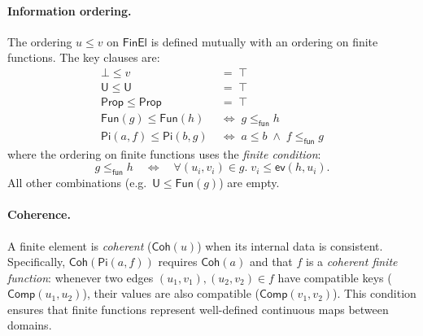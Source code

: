 \documentclass[11pt]{article}
\newcommand{\PropCode}{\mathsf{Prop}}
\newcommand{\FinEl}{\mathsf{FinEl}}
\newcommand{\Bot}{\bot}
\newcommand{\UCode}{\mathsf{U}}
\newcommand{\FunEl}[1]{\mathsf{Fun}(#1)}
\newcommand{\PiC}[2]{\mathsf{Pi}(#1,#2)}
\newcommand{\EvalFun}{\mathsf{ev}}
\newcommand{\LeCode}{\leq}
\newcommand{\Coh}{\mathsf{Coh}}
\begin{document}
\paragraph{Information ordering.}
The ordering $u \LeCode v$ on $\FinEl$ is defined mutually with
an ordering on finite functions.  The key clauses are:
\begin{align*}
  \Bot \LeCode v &\;=\; \top \\
  \UCode \LeCode \UCode &\;=\; \top \\
  \PropCode \LeCode \PropCode &\;=\; \top \\
  \FunEl{g} \LeCode \FunEl{h}
    &\;\Longleftrightarrow\; g \LeCode_{\mathsf{fun}} h \\
  \PiC{a}{f} \LeCode \PiC{b}{g}
    &\;\Longleftrightarrow\;
      a \LeCode b \;\wedge\; f \LeCode_{\mathsf{fun}} g
\end{align*}
where the ordering on finite functions uses the
\emph{finite condition}:
\[
  g \LeCode_{\mathsf{fun}} h
  \quad\Longleftrightarrow\quad
  \forall (u_i, v_i) \in g.\;
    v_i \LeCode \EvalFun(h, u_i).
\]
All other combinations (e.g.\ $\UCode \LeCode \FunEl{g}$)
are empty.

\paragraph{Coherence.}
A finite element is \emph{coherent} ($\Coh(u)$) when its
internal data is consistent.  Specifically,
$\Coh(\PiC{a}{f})$ requires $\Coh(a)$ and that $f$ is a
\emph{coherent finite function}: whenever two edges
$(u_1,v_1),(u_2,v_2) \in f$ have compatible keys
($\mathsf{Comp}(u_1,u_2)$), their values are also compatible
($\mathsf{Comp}(v_1,v_2)$).  This condition ensures that finite
functions represent well-defined continuous maps between domains.
\end{document}
